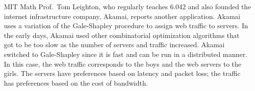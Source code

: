 MIT Math Prof.\ Tom Leighton, who regularly teaches 6.042 and also founded
the internet infrastructure company, Akamai, reports another application.
Akamai uses a variation of the Gale-Shapley procedure to assign web
traffic to servers.  In the early days, Akamai used other combinatorial
optimization algorithms that got to be too slow as the number of servers
and traffic increased.  Akamai switched to Gale-Shapley since it is fast
and can be run in a distributed manner.  In this case, the web traffic
corresponds to the boys and the web servers to the girls.  The servers
have preferences based on latency and packet loss; the traffic has
preferences based on the cost of bandwidth.

\begin{problems}
\practiceproblems



\classproblems



\homeworkproblems




\end{problems}

\endinput
